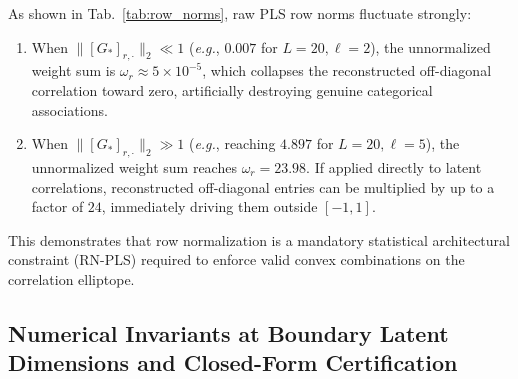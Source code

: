 \documentclass[default,sn-mathphys,Numbered]{sn-jnl}
\theoremstyle{thmstyleone}
\theoremstyle{thmstylethree}
\theoremstyle{thmstyletwo}
\begin{document}
\begin{appendices}
As shown in Tab.~\ref{tab:row_norms}, raw PLS row norms fluctuate strongly:
\begin{enumerate}
    \item When $\|[G_*]_{r, \cdot}\|_2 \ll 1$ (\textit{e.g.}, $0.007$ for $L=20, \ell=2$), the unnormalized weight sum is $\omega_r \approx 5 \times 10^{-5}$, which collapses the reconstructed off-diagonal correlation toward zero, artificially destroying genuine categorical associations.
    \item When $\|[G_*]_{r, \cdot}\|_2 \gg 1$ (\textit{e.g.}, reaching $4.897$ for $L=20, \ell=5$), the unnormalized weight sum reaches $\omega_r = 23.98$. If applied directly to latent correlations, reconstructed off-diagonal entries can be multiplied by up to a factor of $24$, immediately driving them outside $[-1, 1]$.
\end{enumerate}
This demonstrates that row normalization is a mandatory statistical architectural constraint (RN-PLS) required to enforce valid convex combinations on the correlation elliptope.

\subsection{Numerical Invariants at Boundary Latent Dimensions and Closed-Form Certification}
\label{subsec:app_boundary_invariants}


\end{appendices}
\end{document}
